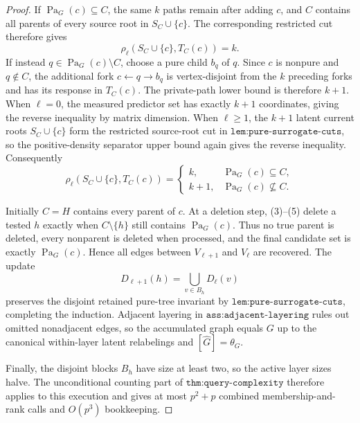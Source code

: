 \documentclass{article}
\begin{document}
\begin{proof}
If \(\operatorname{Pa}_G(c)\subseteq C\), the same \(k\) paths remain after adding \(c\), and \(C\) contains all parents of every source root in \(S_C\cup\{c\}\).  The corresponding restricted cut therefore gives
\[
 \rho_\ell(S_C\cup\{c\},T_C(c))=k. \tag{4}
\]
If instead \(q\in\operatorname{Pa}_G(c)\setminus C\), choose a pure child \(b_q\) of \(q\).  Since \(c\) is nonpure and \(q\notin C\), the additional fork \(c\leftarrow q\to b_q\) is vertex-disjoint from the \(k\) preceding forks and has its response in \(T_C(c)\).  The private-path lower bound is therefore \(k+1\).  When \(\ell=0\), the measured predictor set has exactly \(k+1\) coordinates, giving the reverse inequality by matrix dimension.  When \(\ell\geq1\), the \(k+1\) latent current roots \(S_C\cup\{c\}\) form the restricted source-root cut in \(\texttt{lem:pure-surrogate-cuts}\), so the positive-density separator upper bound again gives the reverse inequality.  Consequently
\[
 \rho_\ell(S_C\cup\{c\},T_C(c))=
 \begin{cases}
 k,&\operatorname{Pa}_G(c)\subseteq C,\\
 k+1,&\operatorname{Pa}_G(c)\nsubseteq C.
 \end{cases} \tag{5}
\]

Initially \(C=H\) contains every parent of \(c\).  At a deletion step, (3)--(5) delete a tested \(h\) exactly when \(C\setminus\{h\}\) still contains \(\operatorname{Pa}_G(c)\).  Thus no true parent is deleted, every nonparent is deleted when processed, and the final candidate set is exactly \(\operatorname{Pa}_G(c)\).  Hence all edges between \(V_{\ell+1}\) and \(V_\ell\) are recovered.  The update
\[
 D_{\ell+1}(h)=\bigcup_{v\in B_h}D_\ell(v)
\]
preserves the disjoint retained pure-tree invariant by \(\texttt{lem:pure-surrogate-cuts}\), completing the induction.  Adjacent layering in \(\texttt{ass:adjacent-layering}\) rules out omitted nonadjacent edges, so the accumulated graph equals \(G\) up to the canonical within-layer latent relabelings and \([\widehat G]=\theta_G\).

Finally, the disjoint blocks \(B_h\) have size at least two, so the active layer sizes halve.  The unconditional counting part of \(\texttt{thm:query-complexity}\) therefore applies to this execution and gives at most \(p^2+p\) combined membership-and-rank calls and \(O(p^3)\) bookkeeping.


\end{proof}
\end{document}
